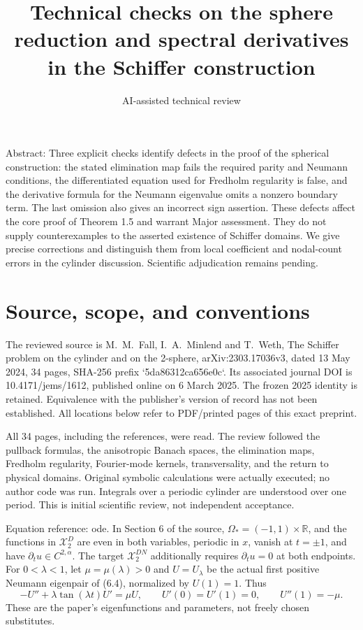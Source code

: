 \documentclass[10pt]{article}
\title{Technical checks on the sphere reduction and spectral derivatives in the Schiffer construction}
\author{AI-assisted technical review}
\date{}
\begin{document}
\maketitle
Abstract: Three explicit checks identify defects in the proof of the spherical construction: the stated elimination map fails the required parity and Neumann conditions, the differentiated equation used for Fredholm regularity is false, and the derivative formula for the Neumann eigenvalue omits a nonzero boundary term. The last omission also gives an incorrect sign assertion. These defects affect the core proof of Theorem 1.5 and warrant Major assessment. They do not supply counterexamples to the asserted existence of Schiffer domains. We give precise corrections and distinguish them from local coefficient and nodal-count errors in the cylinder discussion. Scientific adjudication remains pending.\par
\section*{Source, scope, and conventions}
The reviewed source is M. M. Fall, I. A. Minlend and T. Weth, The Schiffer problem on the cylinder and on the 2-sphere, arXiv:2303.17036v3, dated 13 May 2024, 34 pages, SHA-256 prefix `5da86312ca656e0c`. Its associated journal DOI is 10.4171/jems/1612, published online on 6 March 2025. The frozen 2025 identity is retained. Equivalence with the publisher’s version of record has not been established. All locations below refer to PDF/printed pages of this exact preprint.\par
All 34 pages, including the references, were read. The review followed the pullback formulas, the anisotropic Banach spaces, the elimination maps, Fredholm regularity, Fourier-mode kernels, transversality, and the return to physical domains. Original symbolic calculations were actually executed; no author code was run. Integrals over a periodic cylinder are understood over one period. This is initial scientific review, not independent acceptance.\par
Equation reference: ode. In Section 6 of the source, \(\Omega_*=(-1,1)\times\mathbb R\), and the functions in \(\mathcal X_2^D\) are even in both variables, periodic in \(x\), vanish at \(t=\pm1\), and have \(\partial_tu\in C^{2,\alpha}\). The target \(\mathcal X_2^{DN}\) additionally requires \(\partial_tu=0\) at both endpoints. For \(0<\lambda<1\), let \(\mu=\mu(\lambda)>0\) and \(U=U_\lambda\) be the actual first positive Neumann eigenpair of (6.4), normalized by \(U(1)=1\). Thus \[
-U''+\lambda\tan(\lambda t)U'=\mu U,\qquad
U'(0)=U'(1)=0,\qquad U''(1)=-\mu.\] These are the paper’s eigenfunctions and parameters, not freely chosen substitutes.\par
\end{document}
